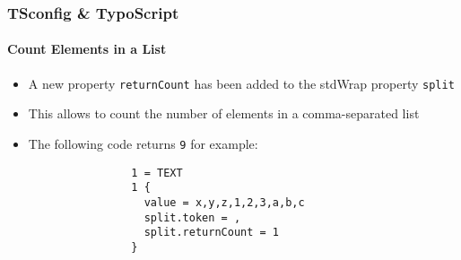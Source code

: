 
\begin{frame}[fragile]
	\frametitle{TSconfig \& TypoScript}
	\framesubtitle{Count Elements in a List}

	\lstset{basicstyle=\tiny\ttfamily}

	\begin{itemize}

		\item A new property \texttt{returnCount} has been added to the stdWrap property \texttt{split}

		\item This allows to count the number of elements in a comma-separated list

		\item The following code returns \texttt{9} for example:

			\begin{lstlisting}
				1 = TEXT
				1 {
				  value = x,y,z,1,2,3,a,b,c
				  split.token = ,
				  split.returnCount = 1
				}
			\end{lstlisting}

	\end{itemize}

\end{frame}


